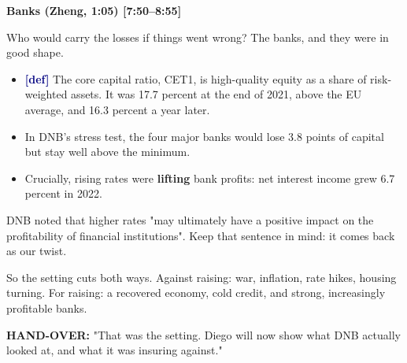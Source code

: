 {\small\textbf{Banks (Zheng, 1:05) [7:50–8:55]}}\par\smallskip
Who would carry the losses if things went wrong? The banks, and they were in good shape.
\begin{itemize}\setlength\itemsep{0pt}
\item \textcolor{navy}{\textbf{[def]}} The core capital ratio, CET1, is high-quality equity as a share of risk-weighted assets. It was 17.7 percent at the end of 2021, above the EU average, and 16.3 percent a year later.
\item In DNB's stress test, the four major banks would lose 3.8 points of capital but stay well above the minimum.
\item Crucially, rising rates were \textbf{lifting} bank profits: net interest income grew 6.7 percent in 2022.
\end{itemize}
\par\smallskip
DNB noted that higher rates "may ultimately have a positive impact on the profitability of financial institutions". Keep that sentence in mind: it comes back as our twist.
\par\smallskip
So the setting cuts both ways. Against raising: war, inflation, rate hikes, housing turning. For raising: a recovered economy, cold credit, and strong, increasingly profitable banks.
\par\smallskip
\textcolor{nlred}{\textbf{HAND-OVER:}} "That was the setting. Diego will now show what DNB actually looked at, and what it was insuring against."

